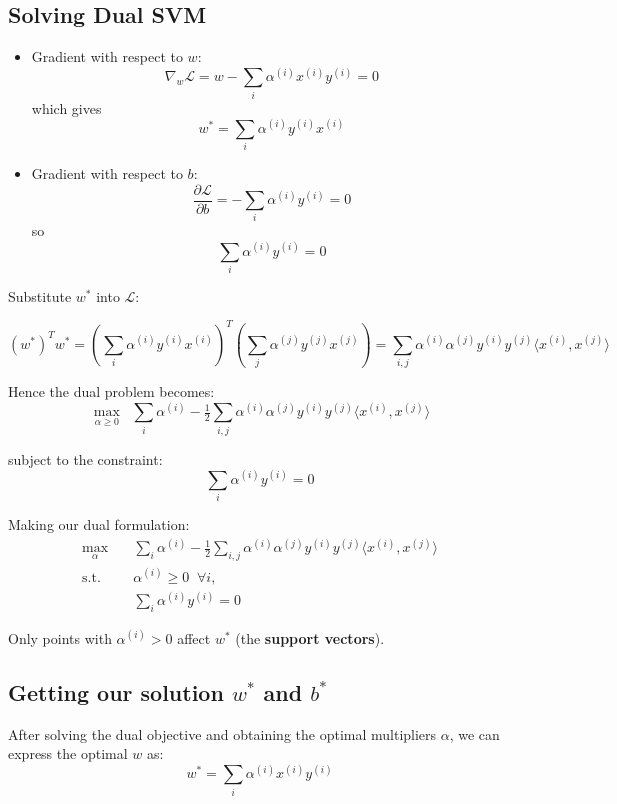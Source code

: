 \documentclass[11pt]{article}
\begin{document}
\subsection*{Solving Dual SVM}

\begin{itemize}
	\item Gradient with respect to $w$:
	      \[
		      \nabla_w \mathcal{L} = w - \sum_i \alpha^{(i)} x^{(i)} y^{(i)} = 0
	      \]
	      which gives
	      \[
		      w^* = \sum_i \alpha^{(i)} y^{(i)} x^{(i)}
	      \]

	\item Gradient with respect to $b$:
	      \[
		      \frac{\partial \mathcal{L}}{\partial b}
		      = - \sum_i \alpha^{(i)} y^{(i)} = 0
	      \]
	      so
	      \[
		      \sum_i \alpha^{(i)} y^{(i)} = 0
	      \]
\end{itemize}

Substitute $w^*$ into $\mathcal{L}$:

\[
	(w^*)^T w^* =
	\left( \sum_i \alpha^{(i)} y^{(i)} x^{(i)} \right)^T
	\left( \sum_j \alpha^{(j)} y^{(j)} x^{(j)} \right)
	= \sum_{i,j} \alpha^{(i)} \alpha^{(j)} y^{(i)} y^{(j)} \langle x^{(i)}, x^{(j)} \rangle
\]

Hence the dual problem becomes:
\[
	\max_{\alpha \geq 0}
	\;\; \sum_i \alpha^{(i)}
	- \tfrac{1}{2} \sum_{i,j} \alpha^{(i)} \alpha^{(j)} y^{(i)} y^{(j)} \langle x^{(i)}, x^{(j)} \rangle
\]

subject to the constraint:
\[
	\sum_i \alpha^{(i)} y^{(i)} = 0
\]

Making our dual formulation:
\[
	\begin{aligned}
		\max_{\alpha} \quad &
		\sum_i \alpha^{(i)}
		- \tfrac{1}{2} \sum_{i,j} \alpha^{(i)} \alpha^{(j)} y^{(i)} y^{(j)} \langle x^{(i)}, x^{(j)} \rangle \\
		\text{s.t.} \quad   & \alpha^{(i)} \geq 0 \;\; \forall i,                                            \\
		                    & \sum_i \alpha^{(i)} y^{(i)} = 0
	\end{aligned}
\]


Only points with $\alpha^{(i)} > 0$ affect $w^*$ (the \textbf{support vectors}).


\subsection*{Getting our solution $w^*$ and $b^*$}

After solving the dual objective and obtaining the optimal multipliers $\alpha$, we can express the optimal $w$ as:
\[
	w^* = \sum_i \alpha^{(i)} x^{(i)} y^{(i)}
\]
\end{document}
